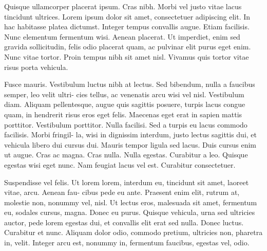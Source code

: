 \documentclass[11pt,a4paper,twoside]{article}\usepackage[]{graphicx}\usepackage[]{color}
\makeatletter
\newenvironment{kframe}{%
 \def\at@end@of@kframe{}%
 \ifinner\ifhmode%
  \def\at@end@of@kframe{\end{minipage}}%
  \begin{minipage}{\columnwidth}%
 \fi\fi%
 \def\FrameCommand##1{\hskip\@totalleftmargin \hskip-\fboxsep
 \colorbox{shadecolor}{##1}\hskip-\fboxsep
     \hskip-\linewidth \hskip-\@totalleftmargin \hskip\columnwidth}%
 \MakeFramed {\advance\hsize-\width
   \@totalleftmargin\z@ \linewidth\hsize
   \@setminipage}}%
 {\par\unskip\endMakeFramed%
 \at@end@of@kframe}
\makeatother
\begin{document}
Quisque ullamcorper placerat ipsum. Cras nibh. Morbi vel justo vitae
lacus tincidunt ultrices. Lorem ipsum dolor sit amet, consectetuer
adipiscing elit. In hac habitasse platea dictumst. Integer tempus
convallis augue. Etiam facilisis. Nunc elementum fermentum wisi. Aenean
placerat. Ut imperdiet, enim sed gravida sollicitudin, felis odio
placerat quam, ac pulvinar elit purus eget enim. Nunc vitae tortor.
Proin tempus nibh sit amet nisl. Vivamus quis tortor vitae risus porta
vehicula. 

Fusce mauris. Vestibulum luctus nibh at lectus. Sed bibendum, nulla
a faucibus semper, leo velit ultri- cies tellus, ac venenatis arcu
wisi vel nisl. Vestibulum diam. Aliquam pellentesque, augue quis sagittis
posuere, turpis lacus congue quam, in hendrerit risus eros eget felis.
Maecenas eget erat in sapien mattis porttitor. Vestibulum porttitor.
Nulla facilisi. Sed a turpis eu lacus commodo facilisis. Morbi fringil-
la, wisi in dignissim interdum, justo lectus sagittis dui, et vehicula
libero dui cursus dui. Mauris tempor ligula sed lacus. Duis cursus
enim ut augue. Cras ac magna. Cras nulla. Nulla egestas. Curabitur
a leo. Quisque egestas wisi eget nunc. Nam feugiat lacus vel est.
Curabitur consectetuer.

Suspendisse vel felis. Ut lorem lorem, interdum eu, tincidunt sit
amet, laoreet vitae, arcu. Aenean fau- cibus pede eu ante. Praesent
enim elit, rutrum at, molestie non, nonummy vel, nisl. Ut lectus eros,
malesuada sit amet, fermentum eu, sodales cursus, magna. Donec eu
purus. Quisque vehicula, urna sed ultricies auctor, pede lorem egestas
dui, et convallis elit erat sed nulla. Donec luctus. Curabitur et
nunc. Aliquam dolor odio, commodo pretium, ultricies non, pharetra
in, velit. Integer arcu est, nonummy in, fermentum faucibus, egestas
vel, odio. 

\begin{kframe}


{\ttfamily\noindent\bfseries{}}

{\ttfamily\noindent\bfseries{}}\end{kframe}
\end{document}

